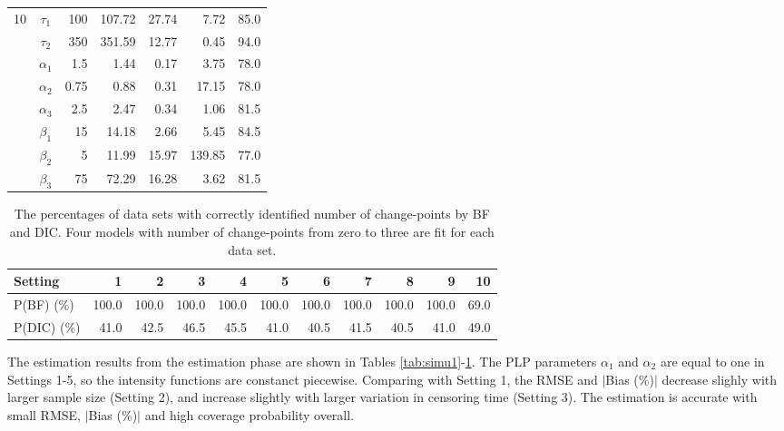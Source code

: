 \documentclass[12pt]{article}
\numberwithin{equation}{section}
\begin{document}
\begin{table}[htbp]
\begin{tabular}{ccrrrrr}
		\multirow{8}[2]{*}{10} 
		& $\tau_1$	     & 100   & 107.72 & 27.74 & 7.72  & 85.0 \\		
		& $\tau_2$	                 & 350   & 351.59 & 12.77 & 0.45  & 94.0 \\		
		& $\alpha_1$	                 & 1.5   & 1.44  & 0.17  & 3.75  & 78.0 \\		
		& $\alpha_2$	        & 0.75  & 0.88  & 0.31  & 17.15 & 78.0 \\		
		& $\alpha_3$	                 & 2.5   & 2.47  & 0.34  & 1.06  & 81.5 \\		
		& $\beta_1$	         & 15    & 14.18 & 2.66  & 5.45  & 84.5 \\		
		& $\beta_2$	         & 5     & 11.99 & 15.97 & 139.85 & 77.0 \\		
		& $\beta_3$	            & 75    & 72.29 & 16.28 & 3.62  & 81.5 \\		
		
		\hline
	\end{tabular}%
	\label{tab:simu2}%
\end{table}%


\begin{table}[htbp]
	\centering
	\caption{The percentages of data sets with correctly identified number of change-points by BF and DIC. Four models with number of change-points from zero to three are fit for each data set.}
	\begin{tabular}{p{5.235em}rrrrrrrrrr}
		\hline
		Setting & 1 &2 & 3 & 4 & 5     & 6     & 7     & 8     & 9&10 \\
		\hline
		P(BF) (\%) & 100.0   & 100.0  & 100.0  & 100.0   & 100.0   & 100.0   & 100.0   & 100.0   & 100.0   & 69.0 \\
		P(DIC) (\%) & 41.0   & 42.5  & 46.5  & 45.5   & 41.0     & 40.5   & 41.5   & 40.5 & 41.0   & 49.0 \\
		\hline
	\end{tabular}%
	\label{tab:simu3}%
\end{table}%

The estimation results from the estimation phase are shown in Tables \ref{tab:simu1}-\ref{tab:simu2}. The PLP parameters $\alpha_1$ and $\alpha_2$ are equal to one in Settings 1-5, so the intensity functions are constanct piecewise. Comparing with Setting 1, the RMSE and $|$Bias (\%)$|$ decrease slighly with larger sample size (Setting 2), and increase slightly with larger variation in censoring time (Setting 3). The estimation is accurate with small RMSE, $|$Bias (\%)$|$ and high coverage probability overall. 
\end{document}
